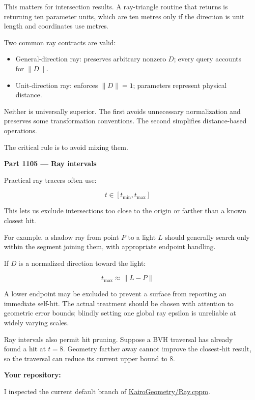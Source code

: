 This matters for intersection results. A ray-triangle routine that returns  is returning ten parameter units, which are ten metres only if the direction is unit length and coordinates use metres.

Two common ray contracts are valid:

\begin{itemize}
\tightlist
\item
  General-direction ray: preserves arbitrary nonzero \(D\); every query accounts for \(\|D\|\).
\item
  Unit-direction ray: enforces \(\|D\|=1\); parameters represent physical distance.
\end{itemize}

Neither is universally superior. The first avoids unnecessary normalization and preserves some transformation conventions. The second simplifies distance-based operations.

The critical rule is to avoid mixing them.

\textbf{Part 1105 --- Ray intervals}

Practical ray tracers often use:

\[
t\in[t_{\min},t_{\max}]
\]

This lets us exclude intersections too close to the origin or farther than a known closest hit.

For example, a shadow ray from point \(P\) to a light \(L\) should generally search only within the segment joining them, with appropriate endpoint handling.

If \(D\) is a normalized direction toward the light:

\[
t_{\max}\approx\|L-P\|
\]

A lower endpoint may be excluded to prevent a surface from reporting an immediate self-hit. The actual treatment should be chosen with attention to geometric error bounds; blindly setting one global ray epsilon is unreliable at widely varying scales.

Ray intervals also permit hit pruning. Suppose a BVH traversal has already found a hit at \(t=8\). Geometry farther away cannot improve the closest-hit result, so the traversal can reduce its current upper bound to \(8\).

\textbf{Your repository: }

I inspected the current default branch of \href{https://github.com/swayam8624/KairoGeometry/blob/master/Ray.cppm?utm_source=chatgpt.com}{KairoGeometry/Ray.cppm}.

